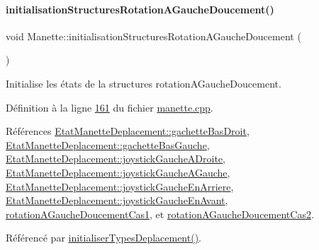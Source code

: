 \paragraph{\texorpdfstring{initialisation\+Structures\+Rotation\+A\+Gauche\+Doucement()}{initialisationStructuresRotationAGaucheDoucement()}}
{\footnotesize\ttfamily void Manette\+::initialisation\+Structures\+Rotation\+A\+Gauche\+Doucement (\begin{DoxyParamCaption}{ }\end{DoxyParamCaption})\hspace{0.3cm}{\ttfamily [private]}}



Initialise les états de la structures rotation\+A\+Gauche\+Doucement. 



Définition à la ligne \hyperlink{manette_8cpp_source_l00161}{161} du fichier \hyperlink{manette_8cpp_source}{manette.\+cpp}.



Références \hyperlink{manette_8h_source_l00185}{Etat\+Manette\+Deplacement\+::gachette\+Bas\+Droit}, \hyperlink{manette_8h_source_l00184}{Etat\+Manette\+Deplacement\+::gachette\+Bas\+Gauche}, \hyperlink{manette_8h_source_l00183}{Etat\+Manette\+Deplacement\+::joystick\+Gauche\+A\+Droite}, \hyperlink{manette_8h_source_l00182}{Etat\+Manette\+Deplacement\+::joystick\+Gauche\+A\+Gauche}, \hyperlink{manette_8h_source_l00181}{Etat\+Manette\+Deplacement\+::joystick\+Gauche\+En\+Arriere}, \hyperlink{manette_8h_source_l00180}{Etat\+Manette\+Deplacement\+::joystick\+Gauche\+En\+Avant}, \hyperlink{manette_8h_source_l00228}{rotation\+A\+Gauche\+Doucement\+Cas1}, et \hyperlink{manette_8h_source_l00229}{rotation\+A\+Gauche\+Doucement\+Cas2}.



Référencé par \hyperlink{manette_8cpp_source_l00085}{initialiser\+Types\+Deplacement()}.


